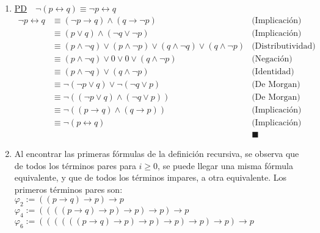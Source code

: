 \documentclass[letter]{article}
\begin{document}
	
	\begin{pregunta}{1} %
		\begin{enumerate}
		\item
			\underline{PD}\ \ $\neg(p \leftrightarrow q) \equiv \neg p \leftrightarrow q$
			\begin{align*}
				\neg p \leftrightarrow q 
				&\equiv (\neg p \rightarrow q) \wedge (q \rightarrow \neg p)
				&\text{(Implicación)}\\
				&\equiv (p \vee q) \wedge (\neg q \vee \neg p)&\text{(Implicación)}\\
				&\equiv (p \wedge \neg q) \vee (p \wedge \neg p) \vee (q \wedge \neg q) \vee (q \wedge \neg p)&\text{(Distributividad)}\\
				&\equiv (p \wedge \neg q) \vee 0 \vee 0 \vee (q \wedge \neg p)&\text{(Negación)}\\
				&\equiv (p \wedge \neg q) \vee (q \wedge \neg p)&\text{(Identidad)}\\
				&\equiv \neg(\neg p \vee q) \vee \neg(\neg q \vee p)&\text{(De Morgan)}\\
				&\equiv \neg((\neg p \vee q) \wedge (\neg q \vee p))&\text{(De Morgan)}\\
				&\equiv \neg((p \rightarrow q) \wedge (q \rightarrow p))&\text{(Implicación)}\\
				&\equiv \neg(p \leftrightarrow q)&\text{(Implicación)}\\
				&&\blacksquare\nonumber
			\end{align*}
		\item
			Al encontrar las primeras fórmulas de la definición recursiva, se observa que de todos los términos pares para $i\geq 0$, se puede llegar una misma fórmula equivalente, y que de todos los términos impares, a otra equivalente. Los primeros términos pares son:\\

			$\varphi_2:=((p \rightarrow q)\rightarrow p)\rightarrow p$\\
			$\varphi_4:=((((p \rightarrow q)\rightarrow p)\rightarrow p)\rightarrow p)\rightarrow p$\\
			$\varphi_6:=((((((p \rightarrow q)\rightarrow p)\rightarrow p)\rightarrow p)\rightarrow p)\rightarrow p)\rightarrow p$\\
			

\end{enumerate}
\end{pregunta}
\end{document}
